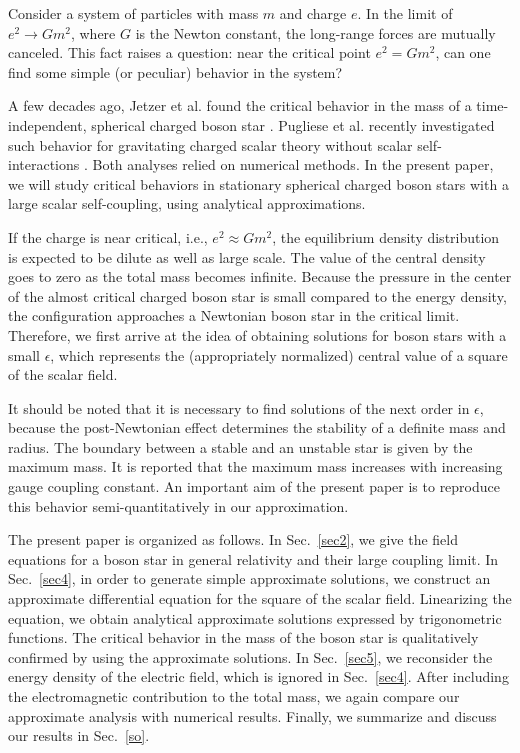 \documentclass[
aps,prd,
12pt,%
nopreprintnumbers,
showpacs,
eqsecnum,
nofootinbib
]{revtex4-1}
\begin{document}
Consider a system of particles with mass $m$ and charge $e$.
In the limit of $e^2\rightarrow Gm^2$, where $G$ is the Newton constant,
the long-range forces are mutually canceled.
This fact raises a question: near the critical point $e^2=Gm^2$, can one find some
simple (or peculiar) behavior in the system?

A few decades ago, Jetzer {et al.} found the critical behavior in the mass of a
time-independent, spherical charged boson star \cite{Jetzer,JB}. Pugliese {et al.}
recently investigated such behavior for gravitating charged scalar theory
without scalar self-interactions
\cite{PQRR}. Both analyses relied on numerical methods. In the present paper, we
will study critical behaviors in stationary spherical charged boson stars
with a large scalar self-coupling, using analytical approximations.

If the charge is near critical, i.e., $e^2\approx Gm^2$, the equilibrium density
distribution is expected to be dilute as well as large scale.
The value of the central density goes to zero as the total mass becomes
infinite. Because the pressure in the center of the almost critical charged boson
star is small compared to the energy density, the configuration approaches a
Newtonian boson star in the critical limit.
Therefore, we first arrive at the idea of obtaining solutions for boson stars with
a small
$\epsilon$, which represents the (appropriately normalized) central value of a
square of the scalar field.

It should be noted that it is necessary to find solutions of the next order in
$\epsilon$, because the post-Newtonian effect determines the stability
of a definite mass and radius.
The boundary between a stable and an unstable star is given by the maximum mass.
It is reported \cite{Jetzer,JB} that the maximum mass increases with increasing
gauge coupling constant. An important aim of the present paper is to reproduce this
behavior semi-quantitatively in our approximation.

The present paper is organized as follows.
In Sec.~\ref{sec2}, we give the field equations for a boson star in general
relativity and their large coupling limit.
In Sec.~\ref{sec4}, in order to generate simple approximate solutions,
we construct an approximate differential equation for the square of the scalar
field. Linearizing the equation, we obtain analytical approximate solutions
expressed by trigonometric functions. The critical behavior in the mass of the
boson star is qualitatively confirmed by using the approximate solutions.
In Sec.~\ref{sec5}, we reconsider the energy density of the electric field, which
is ignored in Sec.~\ref{sec4}. After including the electromagnetic contribution to
the total mass, we again compare our approximate analysis with numerical results.
Finally, we summarize and discuss our results in
Sec.~\ref{so}.
\end{document}
